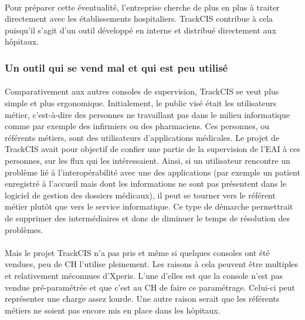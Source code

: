 			\paragraph{}%
			Pour préparer cette éventualité, l'entreprise cherche de plus 
			en plus à traiter directement avec les établissements hospitaliers. TrackCIS
			contribue à cela puisqu'il s'agit d'un outil développé en interne et
			distribué directement aux hôpitaux.
			
		\subsubsection{Un outil qui se vend mal et qui est peu utilisé}
			\paragraph{}%
			Comparativement aux autres consoles de supervision, TrackCIS se veut plus
			simple et plus ergonomique. Initialement, le public visé était les
			utilisateurs métier, c'est-à-dire des personnes ne travaillant pas dans le
			milieu informatique comme par exemple des infirmiers ou des pharmaciens. Ces
			personnes, ou référents métiers, sont des utilisateurs d'applications
			médicales. Le projet de TrackCIS avait pour objectif de confier une partie de
			la supervision de l'EAI à ces personnes, sur les flux qui les intéressaient.
			Ainsi, si un utilisateur rencontre un problème lié à l'interopérabilité avec
			une des applications (par exemple un patient enregistré à l'accueil mais dont
			les informations ne sont pas présentent dans le logiciel de gestion des
			dossiers médicaux), il peut se tourner vers le référent métier plutôt que
			vers le service informatique. Ce type de démarche permettrait de supprimer
			des intermédiaires et donc de diminuer le temps de résolution des problèmes.
			
			\paragraph{}%
			Mais le projet TrackCIS n'a pas pris et même si quelques consoles ont été
			vendues, peu de CH l'utilise pleinement. Les raisons à cela peuvent être
			multiples et relativement méconnues d'Xperis. L'une d'elles est que la
			console n'est pas vendue pré-paramétrée et que c'est au CH de faire ce
			paramétrage.
			Celui-ci peut représenter une charge assez lourde. Une autre raison serait
			que les référents métiers ne soient pas encore mis en place dans les
			hôpitaux.
			
